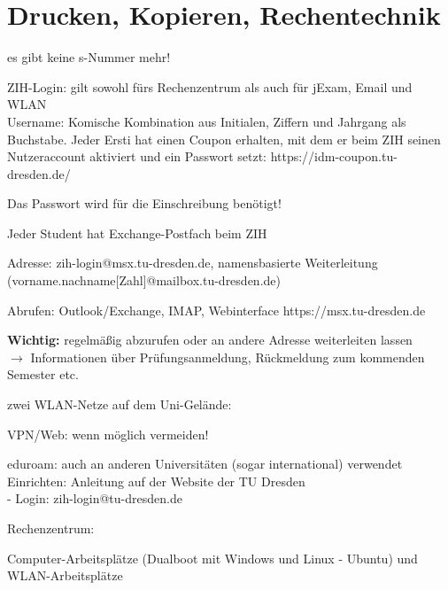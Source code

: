 \documentclass[a4paper,12pt]{report}
\begin{document}
\section{Drucken, Kopieren, Rechentechnik}
\begin{itemize*}
	\item es gibt keine s-Nummer mehr!
    \item ZIH-Login: gilt sowohl fürs Rechenzentrum als auch für jExam, Email und WLAN\\
            Username: Komische Kombination aus Initialen, Ziffern und Jahrgang als Buchstabe.
            Jeder Ersti hat einen Coupon erhalten, mit dem er beim ZIH seinen Nutzeraccount aktiviert und ein Passwort setzt: https://idm-coupon.tu-dresden.de/
    \item Das Passwort wird für die Einschreibung benötigt!
    \item Jeder Student hat Exchange-Postfach beim ZIH
    \begin{itemize*}
        \item Adresse: zih-login@msx.tu-dresden.de, namensbasierte Weiterleitung \\(vorname.nachname[Zahl]@mailbox.tu-dresden.de)
        \item Abrufen: Outlook/Exchange, IMAP, Webinterface https://msx.tu-dresden.de
        \item \textbf{Wichtig:} regelmäßig abzurufen oder an andere Adresse weiterleiten lassen\\
        $\rightarrow$ Informationen über Prüfungsanmeldung, Rückmeldung zum kommenden Semester etc.
    \end{itemize*}
    \item zwei WLAN-Netze auf dem Uni-Gelände:
    \begin{itemize*}
        \item VPN/Web: wenn möglich vermeiden!
        \item eduroam: auch an anderen Universitäten (sogar international) verwendet\\
        Einrichten: Anleitung auf der Website der TU Dresden\\
        - Login: zih-login@tu-dresden.de
    \end{itemize*}
    \item Rechenzentrum:
    \begin{itemize*}
        \item Computer-Arbeitsplätze (Dualboot mit Windows und Linux - Ubuntu) und WLAN-Arbeitsplätze

\end{itemize*}
\end{itemize*}
\end{document}
